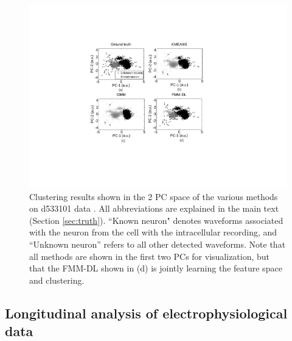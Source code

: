 \documentclass[journal]{IEEEtran}
\begin{document}
\begin{figure}[h!]
  \centering
    \includegraphics[width=1.0\linewidth]{figs_new/Dictionary_hc1.pdf}
    \caption{{{ Clustering results shown in the 2 PC space of the various methods on d533101 data \cite{Henze2000}. All abbreviations are explained in the main text (Section \ref{sec:truth}). ``Known neuron" denotes waveforms associated with the neuron from the cell with the intracellular recording, and ``Unknown neuron'' refers to all other detected waveforms.   Note that all methods are shown in the first two PCs for visualization, but that the FMM-DL shown in (d) is jointly learning the feature space and clustering.
}}} \vspace{-10pt}
\label{fig:Dictionary_hc_1}
\end{figure}



\subsection{Longitudinal analysis of electrophysiological data\label{sec:forensics}}
\end{document}
